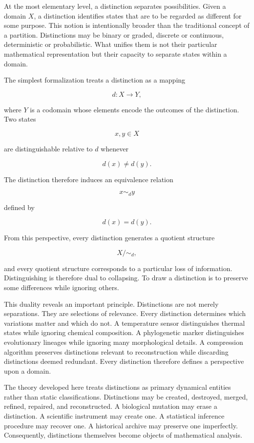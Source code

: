 \documentclass[12pt,oneside]{article}
\theoremstyle{definition}
\begin{document}
At the most elementary level, a distinction separates possibilities. Given a domain \(X\), a distinction identifies states that are to be regarded as different for some purpose. This notion is intentionally broader than the traditional concept of a partition. Distinctions may be binary or graded, discrete or continuous, deterministic or probabilistic. What unifies them is not their particular mathematical representation but their capacity to separate states within a domain.

The simplest formalization treats a distinction as a mapping

\[
d:X\rightarrow Y,
\]

where \(Y\) is a codomain whose elements encode the outcomes of the distinction. Two states

\[
x,y\in X
\]

are distinguishable relative to \(d\) whenever

\[
d(x)\neq d(y).
\]

The distinction therefore induces an equivalence relation

\[
x\sim_d y
\]

defined by

\[
d(x)=d(y).
\]

From this perspective, every distinction generates a quotient structure

\[
X/\!\sim_d,
\]

and every quotient structure corresponds to a particular loss of information. Distinguishing is therefore dual to collapsing. To draw a distinction is to preserve some differences while ignoring others.

This duality reveals an important principle. Distinctions are not merely separations. They are selections of relevance. Every distinction determines which variations matter and which do not. A temperature sensor distinguishes thermal states while ignoring chemical composition. A phylogenetic marker distinguishes evolutionary lineages while ignoring many morphological details. A compression algorithm preserves distinctions relevant to reconstruction while discarding distinctions deemed redundant. Every distinction therefore defines a perspective upon a domain.

The theory developed here treats distinctions as primary dynamical entities rather than static classifications. Distinctions may be created, destroyed, merged, refined, repaired, and reconstructed. A biological mutation may erase a distinction. A scientific instrument may create one. A statistical inference procedure may recover one. A historical archive may preserve one imperfectly. Consequently, distinctions themselves become objects of mathematical analysis.
\end{document}
